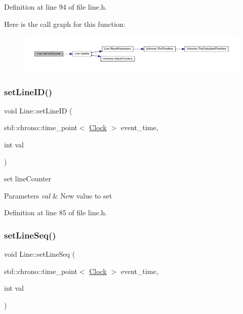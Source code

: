 Definition at line 94 of file line.\+h.

Here is the call graph for this function\+:
\nopagebreak
\begin{figure}[H]
\begin{center}
\leavevmode
\includegraphics[width=350pt]{class_line_ab98abcf3c8546e266ae5bbea243d8b8d_cgraph}
\end{center}
\end{figure}
\mbox{\label{class_line_aaa634bf320b9d1c4becb4083cd8324d4}} 
\subsubsection{\texorpdfstring{set\+Line\+I\+D()}{setLineID()}}
{\footnotesize\ttfamily void Line\+::set\+Line\+ID (\begin{DoxyParamCaption}\item[{std\+::chrono\+::time\+\_\+point$<$ \hyperlink{universe_8h_a0ef8d951d1ca5ab3cfaf7ab4c7a6fd80}{Clock} $>$}]{event\+\_\+time,  }\item[{int}]{val }\end{DoxyParamCaption})\hspace{0.3cm}{\ttfamily [inline]}}

set line\+Counter 
\begin{DoxyParams}{Parameters}
{\em val} & New value to set \\
\hline
\end{DoxyParams}


Definition at line 85 of file line.\+h.

\mbox{\label{class_line_a7c315c5ffdd4fa875918583738e2e157}} 
\subsubsection{\texorpdfstring{set\+Line\+Seq()}{setLineSeq()}}
{\footnotesize\ttfamily void Line\+::set\+Line\+Seq (\begin{DoxyParamCaption}\item[{std\+::chrono\+::time\+\_\+point$<$ \hyperlink{universe_8h_a0ef8d951d1ca5ab3cfaf7ab4c7a6fd80}{Clock} $>$}]{event\+\_\+time,  }\item[{int}]{val }\end{DoxyParamCaption})\hspace{0.3cm}{\ttfamily [inline]}}



